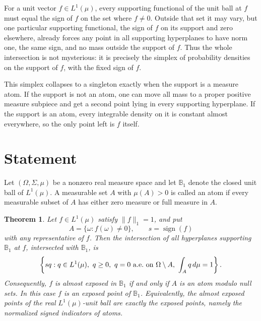 \documentclass[11pt]{article}
\newtheorem{theorem}{Theorem}
\newcommand{\B}{\mathbb{B}}
\begin{document}
For a unit vector \(f\in L^1(\mu)\), every supporting functional of the unit
ball at \(f\) must equal the sign of \(f\) on the set where \(f\ne 0\). Outside
that set it may vary, but one particular supporting functional, the sign of
\(f\) on its support and zero elsewhere, already forces any point in all
supporting hyperplanes to have norm one, the same sign, and no mass outside
the support of \(f\). Thus the whole intersection is not mysterious: it is
precisely the simplex of probability densities on the support of \(f\), with
the fixed sign of \(f\).

This simplex collapses to a singleton exactly when the support is a measure
atom. If the support is not an atom, one can move all mass to a proper positive
measure subpiece and get a second point lying in every supporting hyperplane.
If the support is an atom, every integrable density on it is constant almost
everywhere, so the only point left is \(f\) itself.

\section*{Statement}

Let \((\Omega,\Sigma,\mu)\) be a nonzero real measure space and let
\(\B_{1}\) denote the closed unit ball of \(L^1(\mu)\). A measurable set
\(A\) with \(\mu(A)>0\) is called an atom if every measurable subset of \(A\)
has either zero measure or full measure in \(A\).

\begin{theorem}
Let \(f\in L^1(\mu)\) satisfy \(\|f\|_1=1\), and put
\[
  A=\{\omega: f(\omega)\ne 0\}, \qquad s=\operatorname{sign}(f)
\]
with any representative of \(f\). Then the intersection of all hyperplanes
supporting \(\B_1\) at \(f\), intersected with \(\B_1\), is
\[
  \left\{s q : q\in L^1(\mu),\ q\ge 0,\ q=0\ {\rm a.e.\ on}\ \Omega\setminus A,
  \ \int_A q\,d\mu=1\right\}.
\]
Consequently, \(f\) is almost exposed in \(\B_1\) if and only if \(A\) is an
atom modulo null sets. In this case \(f\) is an exposed point of \(\B_1\).
Equivalently, the almost exposed points of the real \(L^1(\mu)\)-unit ball are
exactly the exposed points, namely the normalized signed indicators of atoms.
\end{theorem}
\end{document}
